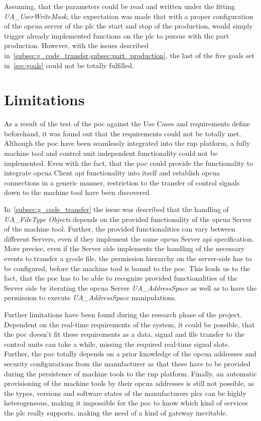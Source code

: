 \documentclass[
a4paper,
twoside,
headsepline,
cleardoublepage=empty,
parskip=half,
draft=false
]{scrbook}
\begin{document}
				Assuming, that the parameters could be read and written under the fitting \textit{UA\_UserWriteMask}, the expectation was made that with a proper configuration of the \gls{opcua} server of the \gls{plc} the start and stop of the production, would simply trigger already implemented functions on the \gls{plc} to pursue with the part production. 
				However, with the issues described in~\cref{subsec:g_code_transfer,subsec:part_production}, the last of the five goals set in~\cref{sec:goals} could not be totally fulfilled.

		\section{Limitations}\label{sec:limitations}

			As a result of the test of the \gls{poc} against the Use Cases and requirements define beforehand, it was found out that the requirements could not be totally met.
			Although the \gls{poc} have been seamlessly integrated into the \gls{rnp} platform, a fully machine tool and control unit independent functionality could not be implemented. 
			Even with the fact, that the \gls{poc} could provide the functionality to integrate \gls{opcua} Client \gls{api} functionality into itself and establish \gls{opcua} connections in a generic manner, restriction to the transfer of control signals down to the machine tool have been discovered.
			
			In~\cref{subsec:g_code_transfer} the issue was described that the handling of \textit{UA\_FileType Objects} depends on the provided functionality of the \gls{opcua} Server of the machine tool. 
			Further, the provided functionalities can vary between different Servers, even if they implement the same \gls{opcua} Server \gls{api} specification. More precise, even if the Server side implements the handling of the necessary events to transfer a \gls{gcode} file, the permission hierarchy on the server-side has to be configured, before the machine tool is bound to the \gls{poc}. This leads us to the fact, that the \gls{poc} has to be able to recognize provided functionalities of the Server side by iterating the \gls{opcua} Server \textit{UA\_AddressSpace} as well as to have the permission to execute \textit{UA\_AddressSpace} manipulations.

			Further limitations have been found during the research phase of the project. Dependent on the real-time requirements of the system, it could be possible, that the \gls{poc} doesn't fit these requirements as a data, signal and file transfer to the control units can take a while, missing the required real-time signal slots. 
			Further, the \gls{poc} totally depends on a prior knowledge of the \gls{opcua} addresses and security configurations from the manufacturer as that these have to be provided during the persistence of machine tools to the \gls{rnp} platform. 
			Finally, an automatic provisioning of the machine tools by their \gls{opcua} addresses is still not possible, as the types, versions and software states of the manufacturers \gls{plc}s can be highly heterogeneous, making it impossible for the \gls{poc} to know which kind of services the \gls{plc} really supports, making the need of a kind of gateway inevitable.
			
\end{document}
